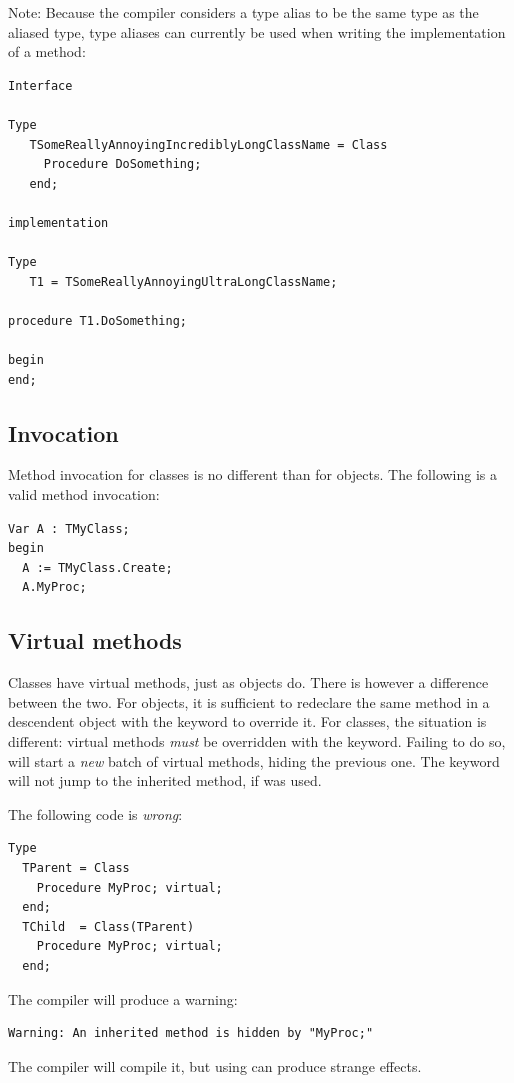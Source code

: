 Note: Because the compiler considers a type alias to be the same type as the aliased type,
type aliases can currently be used when writing the implementation of a method:
\begin{verbatim}
Interface

Type
   TSomeReallyAnnoyingIncrediblyLongClassName = Class
     Procedure DoSomething;
   end;

implementation

Type
   T1 = TSomeReallyAnnoyingUltraLongClassName;

procedure T1.DoSomething;

begin
end;
\end{verbatim}

\subsection{Invocation}
Method invocation for classes is no different than for objects. The
following is a valid method invocation:
\begin{verbatim}
Var A : TMyClass;
begin
  A := TMyClass.Create;
  A.MyProc;
\end{verbatim}


\subsection{Virtual methods}
Classes have virtual methods, just as objects do. There is however a
difference between the two. For objects, it is sufficient to redeclare the
same method in a descendent object with the keyword  to
override it. For classes, the situation is different: virtual methods
{\em must} be overridden with the  keyword. Failing to do so,
will start a {\em new} batch of virtual methods, hiding the previous
one.  The  keyword will not jump to the inherited method, if
 was used.

The following code is {\em wrong}:
\begin{verbatim}
Type
  TParent = Class
    Procedure MyProc; virtual;
  end;
  TChild  = Class(TParent)
    Procedure MyProc; virtual;
  end;
\end{verbatim}
The compiler will produce a warning:
\begin{verbatim}
Warning: An inherited method is hidden by "MyProc;"
\end{verbatim}
The compiler will compile it, but using  can
produce strange effects.

